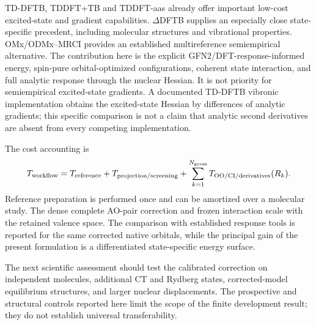 \documentclass[11pt,a4paper]{article}
\begin{document}
TD-DFTB, TDDFT+TB and TDDFT-aas already offer important low-cost excited-state
and gradient capabilities.\cite{dftb2025,tbgrad2023,aas2024}
$\Delta$DFTB supplies an especially close state-specific precedent, including
molecular structures and vibrational properties.\cite{deltadftb2016}
OMx/ODMx--MRCI provides an established multireference semiempirical
alternative.\cite{omxexc2016,odmx2019} The contribution here is the explicit
GFN2/DFT-response-informed energy, spin-pure orbital-optimized configurations,
coherent state interaction, and full analytic response through the nuclear
Hessian. It is not priority for semiempirical excited-state gradients.
A documented TD-DFTB vibronic implementation obtains the excited-state
Hessian by differences of analytic gradients;\cite{tddftbvib2016} this
specific comparison is not a claim that analytic second derivatives are
absent from every competing implementation.

The cost accounting is
\begin{equation}
 T_{\rm workflow}=T_{\rm reference}+T_{\rm projection/screening}
 +\sum_{k=1}^{N_{\rm geom}}T_{\rm OO/CI/derivatives}(R_k).
\end{equation}
Reference preparation is performed once and can be amortized over a molecular
study. The dense complete AO-pair correction and frozen interaction scale with
the retained valence space. The comparison with established response tools is
reported for the same corrected native orbitals, while the principal gain of
the present formulation is a differentiated state-specific energy surface.






The next scientific assessment should test the calibrated correction on
independent molecules, additional CT and Rydberg states, corrected-model
equilibrium structures, and larger nuclear displacements.
The prospective and structural controls reported here limit the scope of
the finite development result; they do not establish universal transferability.
\end{document}
